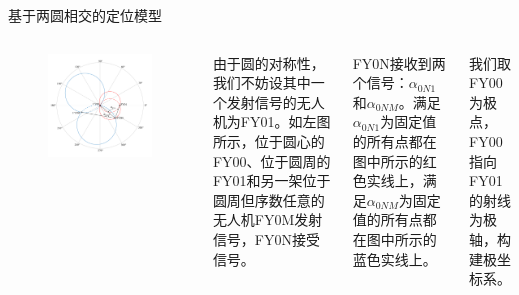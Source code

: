\documentclass[aspectratio=169]{beamer}
\begin{document}
\begin{frame}{基于两圆相交的定位模型}
    \begin{columns}
        \begin{figure}[!ht]
            \centering
            \includegraphics[width=\textwidth]{图片/问题1-1示意图.pdf}
        \end{figure}
        由于圆的对称性，我们不妨设其中一个发射信号的无人机为FY01。如左图所示，位于圆心的FY00、位于圆周的FY01和另一架位于圆周但序数任意的无人机FY0M发射信号，FY0N接受信号。

        FY0N接收到两个信号：$\alpha_{0N1}$和$\alpha_{0NM}$。满足$\alpha_{0N1}$为固定值的所有点都在图中所示的红色实线上，满足$\alpha_{0NM}$为固定值的所有点都在图中所示的蓝色实线上。

        我们取FY00为极点，FY00指向FY01的射线为极轴，构建极坐标系。
    \end{columns}
\end{frame}
\end{document}

